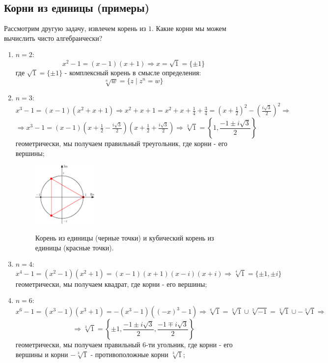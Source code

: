 \documentclass[12pt]{article}
\theoremstyle{definition}
\begin{document}
\subsection*{Корни из единицы (примеры)}
Рассмотрим другую задачу, извлечем корень из $1$. Какие корни мы можем вычислить чисто алгебраически?
\begin{enumerate}[label=\arabic*)]
	\item $n = 2$:
	$$
		x^2 - 1 = (x - 1)(x + 1) \Rightarrow x = \sqrt{1} = \{\pm 1\}
	$$
	где $\sqrt{1} = \{\pm 1\}$ - комплексный корень в смысле определения: 
	$$
		\sqrt[n]{w} = \{z \mid z^n = w\}
	$$
	\item $n=3$:
	$$
		x^3  - 1 = (x - 1)(x^2 + x + 1) \Rightarrow x^2 + x + 1 = x^2 + x + \tfrac{1}{4} + \tfrac{3}{4} = \left(x + \tfrac{1}{2}\right)^2 - \left(\tfrac{i\sqrt{3}}{2}\right)^2 \Rightarrow
	$$
	$$
		\Rightarrow x^3  - 1 = (x - 1)\left(x + \tfrac{1}{2} - \tfrac{i\sqrt{3}}{2}\right)\left(x + \tfrac{1}{2} + \tfrac{i\sqrt{3}}{2}\right)\Rightarrow \sqrt[3]{1} = \left\{1, \dfrac{-1 \pm i\sqrt{3}}{2}\right\}
	$$
	геометрически, мы получаем правильный треугольник, где корни - его вершины;
	\begin{figure}[H]
		\centering
		\includegraphics[width=0.3\textwidth]{AL1S2_3.eps}
		\label{2_3}
		\caption{Корень из единицы (черные точки) и кубический корень из единицы (красные точки).}
	\end{figure}
	\item $n = 4$:
	$$
		x^4 - 1 = (x^2 - 1)(x^2 + 1) = (x - 1)(x+1)(x -i)(x + i) \Rightarrow \sqrt[4]{1} = \{\pm 1, \pm i\}
	$$
	геометрически, мы получаем квадрат, где корни - его вершины;
	\item $n = 6$:
	$$
		x^6 - 1 = (x^3 - 1)(x^3 + 1) = -(x^3 - 1)((-x)^3 - 1) \Rightarrow \sqrt[6]{1} = \sqrt[3]{1} \cup \sqrt[3]{-1} = \sqrt[3]{1} \cup -\sqrt[3]{1} \Rightarrow
	$$
	$$
		\Rightarrow \sqrt[3]{1} = \left\{\pm 1, \dfrac{-1 \pm i\sqrt{3}}{2}, \dfrac{-1 \mp i\sqrt{3}}{2}\right\}
	$$
	геометрически, мы получаем правильный $6$-ти угольник, где корни - его вершины и корни $-\sqrt[3]{1}$ - противоположные корни $\sqrt[3]{1}$;
	\begin{figure}[H]

\end{figure}
\end{enumerate}
\end{document}
